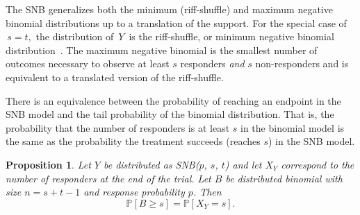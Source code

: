 \documentclass[review]{elsarticle}
\newtheorem{prop}{Proposition}
\begin{document}
The SNB generalizes both the minimum (riff-shuffle) and maximum negative
binomial distributions up to a translation of the support.
For the special case of $\,s=t,$ the distribution of $\,Y\,$ is the
riff-shuffle, or minimum negative binomial distribution~\citep{Uppuluri1967}.
The maximum negative binomial \cite{Zhang2000,Zelterman2005} is the smallest 
number of outcomes necessary to 
observe at least $s$ responders {\em and} $s$ non-responders and is equivalent
to a translated version of the riff-shuffle. 


There is an equivalence between the probability of reaching an endpoint 
in the SNB model and the tail probability of the binomial distribution.
That is, the probability that the number of responders is at least $s$ in the 
binomial model is the same as the probability the treatment succeeds 
(reaches $s$) in the SNB 
model.
\begin{prop} \label{binomial_tail}
Let $Y$ be distributed as SNB($p$, $s$, $t$) and let $X_Y$ correspond
to the number of responders at the end of the trial. Let 
$B$ be distributed binomial with size $n=s+t-1$ and response probability
$p$. Then
\begin{equation}
\mathbb{P}[B \geq s] = \mathbb{P} [X_Y = s].
\end{equation}
\end{prop}
\end{document}
